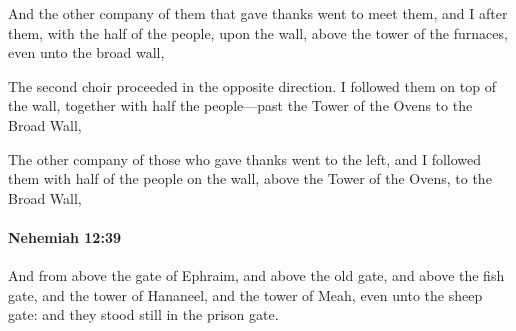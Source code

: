 			\begin{versebox}
					\item[BHS] 
					\item[ASV] And the other company of them that gave thanks went to meet them, and I after them, with the half of the people, upon the wall, above the tower of the furnaces, even unto the broad wall,
					\item[NIV] The second choir proceeded in the opposite direction. I followed them on top of the wall, together with half the people—past the Tower of the Ovens to the Broad Wall,
					\item[NRSV] The other company of those who gave thanks went to the left, and I followed them with half of the people on the wall, above the Tower of the Ovens, to the Broad Wall,
			\end{versebox}

		\paragraph{Nehemiah 12:39} %
			\label{NEHEMIAH-12-39}

			And from above the gate of Ephraim, and above the old gate, and above the fish gate, and the tower of Hananeel, and the tower of Meah, even unto the sheep gate: and they stood still in the prison gate.

